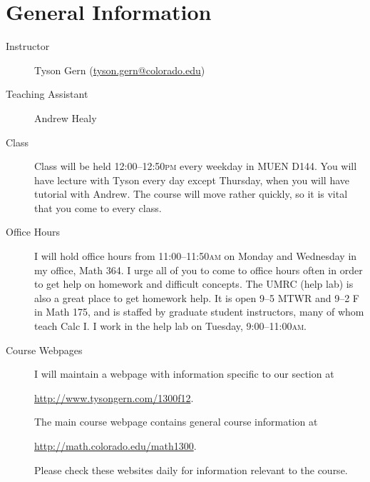 \documentclass[11pt]{article}
\begin{document}
\drawtitle

\section*{General Information}
\begin{description}
\item[Instructor] Tyson Gern
  (\href{mailto:tyson.gern@colorado.edu}{tyson.gern@colorado.edu})
\item[Teaching Assistant] Andrew Healy
\item[Class] Class will be held 12:00--12:50\textsc{pm} every weekday
  in MUEN D144.  You will have lecture with Tyson every day except
  Thursday, when you will have tutorial with Andrew.  The course will
  move rather quickly, so it is vital that you come to every class.
\item[Office Hours] I will hold office hours from
  11:00--11:50\textsc{am} on Monday and Wednesday in my office, Math
  364.  I urge all of you to come to office hours often in order to
  get help on homework and difficult concepts.  The UMRC (help lab) is
  also a great place to get homework help.  It is open 9--5 MTWR and
  9--2 F in Math 175, and is staffed by graduate student instructors,
  many of whom teach Calc I.  I work in the help lab on Tuesday,
  9:00--11:00\textsc{am}.
\item[Course Webpages] I will maintain a webpage with information
  specific to our section at
  \begin{center}
    \url{http://www.tysongern.com/1300f12}.
  \end{center}
  The main course webpage contains general course information at
  \begin{center}
      \url{http://math.colorado.edu/math1300}.
  \end{center}
  Please check these websites daily for information relevant to the
  course.
\end{description}
\end{document}
